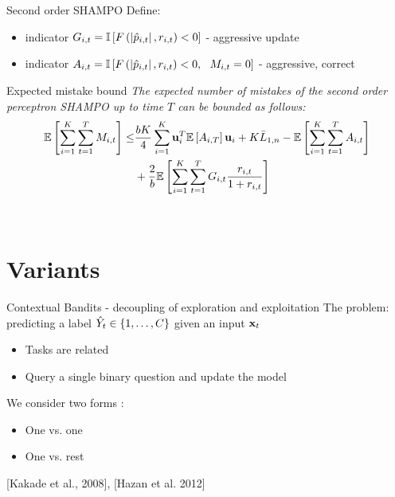 \documentclass{beamer}
\begin{document}
\begin{frame}{Second order SHAMPO}
Define:
\begin{itemize}
\item indicator $G_{i,t}=\mathbb{I}\left[{F\left({\left\vert{\hat{p}_{i,t}}\right\vert,r_{i,t}}\right)<0}\right]  $ - aggressive update\newline
\item indicator $A_{i,t}=\mathbb{I}\left[{F\left({\left\vert{\hat{p}_{i,t}}\right\vert,r_{i,t}}\right)<0,~~M_{i,t}=0}\right]$ - aggressive, correct\newline
\end{itemize}
\begin{block}{Expected mistake bound}
\emph{The  expected number of mistakes  of the second order perceptron SHAMPO  up to time $T$ can be bounded as follows:}
\begin{equation*}
\begin{split}
\mathbb{E}\left[ \sum_{i=1}^{K}\sum_{t=1}^{T}{M_{i,t}} \right]
\le &\frac{bK}{4}\sum_{i=1}^{K}\mathbf{u}_i^T \mathbb{E}\left[{A_{i,T}}\right] \mathbf{u}_i+K{\bar L}_{1,n}-\mathbb{E}\left[{\sum_{i=1}^{K}\sum_{t=1}^{T}A_{i,t}}\right]\\
&+\frac{2}{b}\mathbb{E}\left[{\sum_{i=1}^{K}\sum_{t=1}^{T}G_{i,t}\frac{r_{i,t}}{1+r_{i,t}}}\right]
\end{split}
\end{equation*}
\end{block}
\
\end{frame}

\section{Variants}

\begin{frame}{Contextual Bandits - decoupling of exploration and exploitation}
The problem: predicting a label $\hat{Y}_t \in\{ 1 , \ldots , C\}$ given an input $\mathbf{x}_{t}$\newline
\begin{itemize}
\item Tasks are related\newline
\item Query a single binary question and update the model\newline
\end{itemize}
We consider  two forms  :\newline
\begin{itemize}
\item One vs. one \newline
\item One vs. rest \newline
\end{itemize}
[Kakade et al., 2008], [Hazan et al. 2012]
\end{frame}
\end{document}
